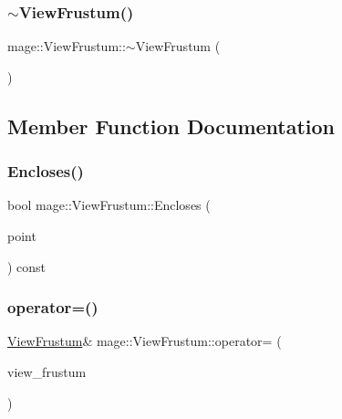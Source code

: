\subsubsection{\texorpdfstring{$\sim$\+View\+Frustum()}{~ViewFrustum()}}
{\footnotesize\ttfamily mage\+::\+View\+Frustum\+::$\sim$\+View\+Frustum (\begin{DoxyParamCaption}{ }\end{DoxyParamCaption})\hspace{0.3cm}{\ttfamily [default]}}



\subsection{Member Function Documentation}
\hypertarget{classmage_1_1_view_frustum_a290ee7b311278ed4701203859773aa42}{}\label{classmage_1_1_view_frustum_a290ee7b311278ed4701203859773aa42} 
\subsubsection{\texorpdfstring{Encloses()}{Encloses()}}
{\footnotesize\ttfamily bool mage\+::\+View\+Frustum\+::\+Encloses (\begin{DoxyParamCaption}\item[{const \hyperlink{structmage_1_1_point3}{Point3} \&}]{point }\end{DoxyParamCaption}) const}

\hypertarget{classmage_1_1_view_frustum_add514821f691117c0ab139c13f86ef70}{}\label{classmage_1_1_view_frustum_add514821f691117c0ab139c13f86ef70} 
\subsubsection{\texorpdfstring{operator=()}{operator=()}}
{\footnotesize\ttfamily \hyperlink{classmage_1_1_view_frustum}{View\+Frustum}\& mage\+::\+View\+Frustum\+::operator= (\begin{DoxyParamCaption}\item[{const \hyperlink{classmage_1_1_view_frustum}{View\+Frustum} \&}]{view\+\_\+frustum }\end{DoxyParamCaption})\hspace{0.3cm}{\ttfamily [default]}}

